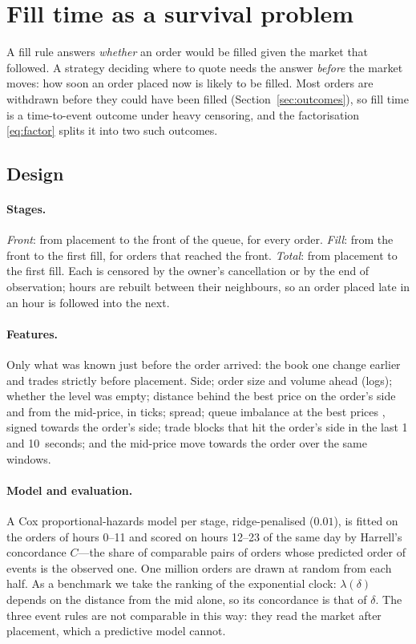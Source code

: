 \section{Fill time as a survival problem}
\label{sec:survival}

A fill rule answers \emph{whether} an order would be filled given the market that
followed. A strategy deciding where to quote needs the answer \emph{before} the
market moves: how soon an order placed now is likely to be filled. Most orders
are withdrawn before they could have been filled (Section~\ref{sec:outcomes}), so
fill time is a time-to-event outcome under heavy censoring, and the factorisation
\eqref{eq:factor} splits it into two such outcomes.

\subsection{Design}

\paragraph{Stages.}
\emph{Front}: from placement to the front of the queue, for every order.
\emph{Fill}: from the front to the first fill, for orders that reached the front.
\emph{Total}: from placement to the first fill. Each is censored by the owner's
cancellation or by the end of observation; hours are rebuilt between their
neighbours, so an order placed late in an hour is followed into the next.

\paragraph{Features.}
Only what was known just before the order arrived: the book one change earlier
and trades strictly before placement. Side; order size and volume ahead (logs);
whether the level was empty; distance behind the best price on the order's side
and from the mid-price, in ticks; spread; queue imbalance at the best prices
\citep{gould2016queue}, signed towards the order's side; trade blocks that hit the
order's side in the last 1 and 10~seconds; and the mid-price move towards the
order over the same windows.

\paragraph{Model and evaluation.}
A Cox proportional-hazards model per stage, ridge-penalised ($0.01$), is fitted on
the orders of hours 0--11 and scored on hours 12--23 of the same day by Harrell's
concordance $C$---the share of comparable pairs of orders whose predicted order of
events is the observed one. One million orders are drawn at random from each half.
As a benchmark we take the ranking of the exponential clock: $\lambda(\delta)$
depends on the distance from the mid alone, so its concordance is that of $\delta$.
The three event rules are not comparable in this way: they read the market after
placement, which a predictive model cannot.


